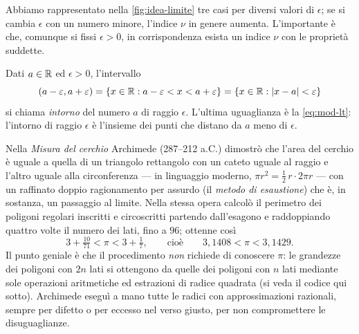 Abbiamo rappresentato nella \cref{fig:idea-limite} tre casi per diversi valori di
$\epsilon$; se si cambia $\epsilon$ con un numero minore, l'indice $\nu$ in genere
aumenta. L'importante è che, comunque si fissi $\epsilon>0$, in corrispondenza esista un
indice $\nu$ con le proprietà suddette.

\begin{definizione}[Intorno]
Dati $a\in\mathbb{R}$ ed $\epsilon>0$, l'intervallo
\begin{equation}\label{eq:intorno}
  (a-\varepsilon,a+\varepsilon)=\{x\in\mathbb{R} : a-\varepsilon<x<a+\varepsilon\}=\{x\in\mathbb{R} : \lvert x-a\rvert<\varepsilon\}
\end{equation}
si chiama \emph{intorno} del numero $a$ di raggio $\epsilon$. L'ultima uguaglianza è la
\eqref{eq:mod-lt}: l'intorno di raggio $\epsilon$ è l'insieme dei punti che distano da
$a$ meno di $\epsilon$.
\end{definizione}

\begin{notastorica}
Nella \emph{Misura del cerchio} Archimede (287--212 a.C.) dimostrò che l'area del
cerchio è uguale a quella di un triangolo rettangolo con un cateto uguale al raggio e
l'altro uguale alla circonferenza --- in linguaggio moderno, $\pi r^{2}=\frac12\,r\cdot2\pi
r$ --- con un raffinato doppio ragionamento per assurdo (il \emph{metodo di esaustione})
che è, in sostanza, un passaggio al limite. Nella stessa opera calcolò il perimetro dei
poligoni regolari inscritti e circoscritti partendo dall'esagono e raddoppiando quattro
volte il numero dei lati, fino a $96$; ottenne così
\[
  3+\tfrac{10}{71}<\pi<3+\tfrac17,\qquad\text{cioè}\qquad 3{,}1408<\pi<3{,}1429 .
\]
Il punto geniale è che il procedimento \emph{non} richiede di conoscere $\pi$: le
grandezze dei poligoni con $2n$ lati si ottengono da quelle dei poligoni con $n$ lati
mediante sole operazioni aritmetiche ed estrazioni di radice quadrata (si veda il codice
qui sotto). Archimede eseguì a mano tutte le radici con approssimazioni razionali,
sempre per difetto o per eccesso nel verso giusto, per non compromettere le
disuguaglianze.
\end{notastorica}

